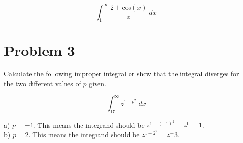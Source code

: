 \documentclass[11pt]{article}
\begin{document}
$$\int_{1}^{\infty} \frac{2+\text{cos}(x)}{x} \; dx$$
$$$$
$$$$
$$$$

\newpage

\section*{Problem 3}
Calculate the following improper integral or show that the integral diverges for the two different values of $p$ given.

$$\int_{17}^{\infty} z^{1-p^2} \; dx$$

a) $p = -1$. This means the integrand should be $z^{1-(-1)^2} = z^0 = 1$.\\
b) $p = 2$. This means the integrand should be $z^{1-2^2} = z^-3$.

\newpage
\end{document}
